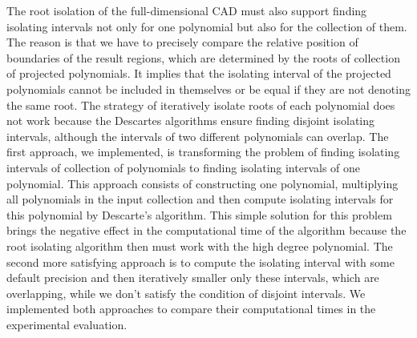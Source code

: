 \documentclass[
  digital, %
  twoside, %
  table,   %
  nolof,     %
  nolot,     %
]{fithesis3}
\begin{document}
The root isolation of the full-dimensional CAD must also support finding isolating intervals not only for one polynomial but also for the collection of them.
The reason is that we have to precisely compare the relative position of boundaries of the result regions, which are determined by the roots of collection of projected polynomials. It implies that the isolating interval of the projected polynomials cannot be included in themselves or be equal if they are not denoting the same root.
The strategy of iteratively isolate roots of each polynomial does not work because the Descartes algorithms ensure finding disjoint isolating intervals, although the intervals of two different polynomials can overlap.
The first approach, we implemented, is transforming the problem of finding isolating intervals of collection of polynomials to finding isolating intervals of one polynomial. This approach consists of constructing one polynomial, multiplying all polynomials in the input collection and then compute isolating intervals for this polynomial by Descarte's algorithm. 
This simple solution for this problem brings the negative effect in the computational time of the algorithm because the root isolating algorithm then must work with the high degree polynomial.
The second more satisfying approach is to compute the isolating interval with some default precision and then iteratively smaller only these intervals, which are overlapping, while we don't satisfy the condition of disjoint intervals.
We implemented both approaches to compare their computational times in the experimental evaluation.
\end{document}
